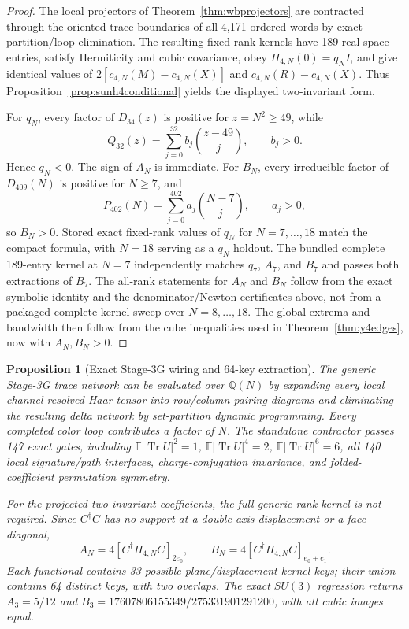 \documentclass[11pt]{article}
\newtheorem{proposition}[theorem]{Proposition}
\newcommand{\Tr}{\operatorname{Tr}}
\begin{document}
\begin{proof}
The local projectors of Theorem~\ref{thm:wbprojectors} are contracted through
the oriented trace boundaries of all 4,171 ordered words by exact
partition/loop elimination. The resulting fixed-rank kernels have 189
real-space entries, satisfy Hermiticity and cubic covariance, obey
$H_{4,N}(0)=q_NI$, and give identical values of
$2[c_{4,N}(M)-c_{4,N}(X)]$ and $c_{4,N}(R)-c_{4,N}(X)$. Thus
Proposition~\ref{prop:sunh4conditional} yields the displayed two-invariant
form.

For $q_N$, every factor of $D_{34}(z)$ is positive for $z=N^2\geq49$, while
\[
Q_{32}(z)=\sum_{j=0}^{32}b_j\binom{z-49}{j},\qquad b_j>0.
\]
Hence $q_N<0$. The sign of $A_N$ is immediate. For $B_N$, every irreducible
factor of $D_{409}(N)$ is positive for $N\geq7$, and
\[
P_{402}(N)=\sum_{j=0}^{402}a_j\binom{N-7}{j},\qquad a_j>0,
\]
so $B_N>0$. Stored exact fixed-rank values of $q_N$ for
$N=7,\ldots,18$ match the compact formula, with $N=18$ serving as a
$q_N$ holdout. The bundled complete 189-entry kernel at $N=7$ independently
matches $q_7$, $A_7$, and $B_7$ and passes both extractions of $B_7$. The
all-rank statements for $A_N$ and $B_N$ follow from the exact symbolic
identity and the denominator/Newton certificates above, not from a packaged
complete-kernel sweep over $N=8,\ldots,18$. The global extrema and bandwidth
then follow from the cube inequalities used in Theorem~\ref{thm:y4edges},
now with $A_N,B_N>0$.
\end{proof}

\begin{proposition}[Exact Stage-3G wiring and 64-key extraction]
\label{prop:stage3gwiring}
The generic Stage-3G trace network can be evaluated over $\mathbb Q(N)$ by
expanding every local channel-resolved Haar tensor into row/column pairing
diagrams and eliminating the resulting delta network by set-partition dynamic
programming. Every completed color loop contributes a factor of $N$. The
standalone contractor passes 147 exact gates, including
$\mathbb E|\Tr U|^2=1$, $\mathbb E|\Tr U|^4=2$,
$\mathbb E|\Tr U|^6=6$, all 140 local signature/path interfaces,
charge-conjugation invariance, and folded-coefficient permutation symmetry.

For the projected two-invariant coefficients, the full generic-rank kernel is
not required. Since $C^\dagger C$ has no support at a double-axis displacement
or a face diagonal,
\[
A_N=4[ C^\dagger H_{4,N}C ]_{2e_0},\qquad
B_N=4[ C^\dagger H_{4,N}C ]_{e_0+e_1}.
\]
Each functional contains 33 possible plane/displacement kernel keys; their
union contains 64 distinct keys, with two overlaps. The exact $SU(3)$
regression returns $A_3=5/12$ and
$B_3=17607806155349/275331901291200$, with all cubic images equal.
\end{proposition}
\end{document}
